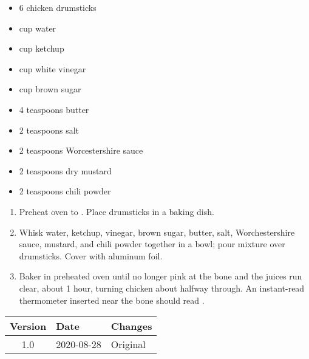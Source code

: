 
\ingredients
\begin{multicols}{2}
\raggedcolumns %
\begin{itemize}
    \item 6 chicken drumsticks
    \item {} cup water
    \item {} cup ketchup
    \item {} cup white vinegar
    \item {} cup brown sugar
    \item 4 teaspoons butter
    \item 2 teaspoons salt
    \item 2 teaspoons Worcestershire sauce
    \item 2 teaspoons dry mustard
    \item 2 teaspoons chili powder
\end{itemize}
\end{multicols}

\instructions
\begin{enumerate}
    \item Preheat oven to . Place drumsticks in a baking dish.
    \item Whisk water, ketchup, vinegar, brown sugar, butter, salt, Worchestershire sauce, mustard, and chili powder together in a bowl; pour mixture over drumsticks. Cover with aluminum foil. 
    \item Baker in preheated oven until no longer pink at the bone and the juices run clear, about 1 hour, turning chicken about halfway through. An instant-read thermometer inserted near the bone should read .
\end{enumerate}

\vfill

\begin{tabular}{ c | l | l }
  \textbf{Version} & \textbf{Date} & \textbf{Changes} \\ 
  \hline		
  1.0 & 2020-08-28 & Original \\
\end{tabular}



